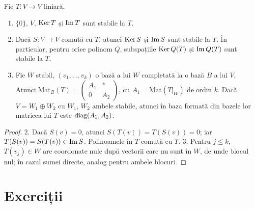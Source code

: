\begin{propozitie}\label{prop:stabile}
Fie $T:V\to V$ liniară.
\begin{enumerate}
\item $\{0\}$, $V$, $\operatorname{Ker} T$ și $\operatorname{Im} T$ sunt stabile la $T$.
\item Dacă $S:V\to V$ comută cu $T$, atunci $\operatorname{Ker} S$ și $\operatorname{Im} S$ sunt stabile la $T$. În particular, pentru orice polinom $Q$, subspațiile $\operatorname{Ker} Q(T)$ și $\operatorname{Im} Q(T)$ sunt stabile la $T$.
\item Fie $W$ stabil, $(v_1,\dots,v_k)$ o bază a lui $W$ completată la o bază $B$ a lui $V$. Atunci $\mathrm{Mat}_B(T)=\begin{pmatrix}A_1&*\\0&A_2\end{pmatrix}$, cu $A_1=\mathrm{Mat}(T|_W)$ de ordin $k$. Dacă $V=W_1\oplus W_2$ cu $W_1$, $W_2$ ambele stabile, atunci în baza formată din bazele lor matricea lui $T$ este $\operatorname{diag}(A_1,A_2)$.
\end{enumerate}
\end{propozitie}

\begin{proof}
2. Dacă $S(v)=0$, atunci $S(T(v))=T(S(v))=0$; iar $T(S(v))=S(T(v))\in\operatorname{Im} S$. Polinoamele în $T$ comută cu $T$.
3. Pentru $j\le k$, $T(v_j)\in W$ are coordonate nule după vectorii care nu sunt în $W$, de unde blocul nul; în cazul sumei directe, analog pentru ambele blocuri.
\end{proof}

\section{Exerciții}

